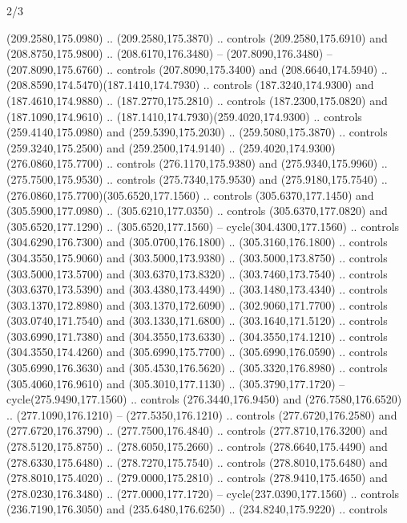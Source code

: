 \begin{flagdescription}{2/3}
\begin{scope}[xshift=0.5\flaglength,yshift=0.5\flagwidth,scale=\flagwidth/259.2]
\begin{scope}[y=0.8pt, x=0.8pt, yscale=-1,shift={(-243,-162)}]
      (209.2580,175.0980) .. (209.2580,175.3870) .. controls (209.2580,175.6910) and
      (208.8750,175.9800) .. (208.6170,176.3480) -- (207.8090,176.3480) --
      (207.8090,175.6760) .. controls (207.8090,175.3400) and (208.6640,174.5940) ..
      (208.8590,174.5470)(187.1410,174.7930) .. controls (187.3240,174.9300) and
      (187.4610,174.9880) .. (187.2770,175.2810) .. controls (187.2300,175.0820) and
      (187.1090,174.9610) .. (187.1410,174.7930)(259.4020,174.9300) .. controls
      (259.4140,175.0980) and (259.5390,175.2030) .. (259.5080,175.3870) .. controls
      (259.3240,175.2500) and (259.2500,174.9140) ..
      (259.4020,174.9300)(276.0860,175.7700) .. controls (276.1170,175.9380) and
      (275.9340,175.9960) .. (275.7500,175.9530) .. controls (275.7340,175.9530) and
      (275.9180,175.7540) .. (276.0860,175.7700)(305.6520,177.1560) .. controls
      (305.6370,177.1450) and (305.5900,177.0980) .. (305.6210,177.0350) .. controls
      (305.6370,177.0820) and (305.6520,177.1290) .. (305.6520,177.1560) --
      cycle(304.4300,177.1560) .. controls (304.6290,176.7300) and
      (305.0700,176.1800) .. (305.3160,176.1800) .. controls (304.3550,175.9060) and
      (303.5000,173.9380) .. (303.5000,173.8750) .. controls (303.5000,173.5700) and
      (303.6370,173.8320) .. (303.7460,173.7540) .. controls (303.6370,173.5390) and
      (303.4380,173.4490) .. (303.1480,173.4340) .. controls (303.1370,172.8980) and
      (303.1370,172.6090) .. (302.9060,171.7700) .. controls (303.0740,171.7540) and
      (303.1330,171.6800) .. (303.1640,171.5120) .. controls (303.6990,171.7380) and
      (304.3550,173.6330) .. (304.3550,174.1210) .. controls (304.3550,174.4260) and
      (305.6990,175.7700) .. (305.6990,176.0590) .. controls (305.6990,176.3630) and
      (305.4530,176.5620) .. (305.3320,176.8980) .. controls (305.4060,176.9610) and
      (305.3010,177.1130) .. (305.3790,177.1720) -- cycle(275.9490,177.1560) ..
      controls (276.3440,176.9450) and (276.7580,176.6520) .. (277.1090,176.1210) --
      (277.5350,176.1210) .. controls (277.6720,176.2580) and (277.6720,176.3790) ..
      (277.7500,176.4840) .. controls (277.8710,176.3200) and (278.5120,175.8750) ..
      (278.6050,175.2660) .. controls (278.6640,175.4490) and (278.6330,175.6480) ..
      (278.7270,175.7540) .. controls (278.8010,175.6480) and (278.8010,175.4020) ..
      (279.0000,175.2810) .. controls (278.9410,175.4650) and (278.0230,176.3480) ..
      (277.0000,177.1720) -- cycle(237.0390,177.1560) .. controls
      (236.7190,176.3050) and (235.6480,176.6250) .. (234.8240,175.9220) .. controls

\end{scope}
\end{scope}
\end{flagdescription}
